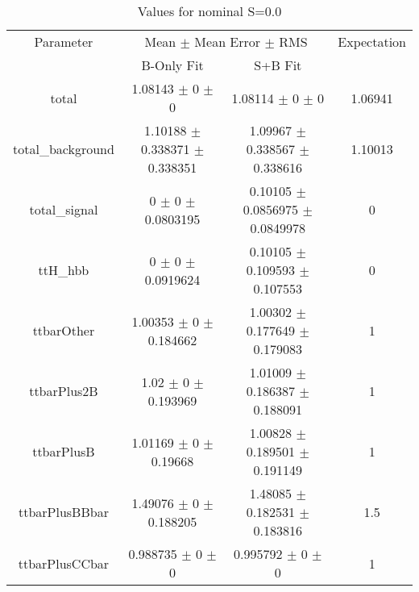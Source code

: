 \begin{table}
\centering
\caption{Values for nominal S=0.0}
\begin{tabular}{cccc}
\toprule
Parameter & \multicolumn{2}{c}{Mean $\pm$ Mean Error $\pm$ RMS} & Expectation\\
 & B-Only Fit & S+B Fit & \\
\midrule
total & \num{1.08143} $\pm$ \num{0} $\pm$ \num{0} & \num{1.08114} $\pm$ \num{0} $\pm$ \num{0} & \num{1.06941}\\
total\_background & \num{1.10188} $\pm$ \num{0.338371} $\pm$ \num{0.338351} & \num{1.09967} $\pm$ \num{0.338567} $\pm$ \num{0.338616} & \num{1.10013}\\
total\_signal & \num{0} $\pm$ \num{0} $\pm$ \num{0.0803195} & \num{0.10105} $\pm$ \num{0.0856975} $\pm$ \num{0.0849978} & \num{0}\\
ttH\_hbb & \num{0} $\pm$ \num{0} $\pm$ \num{0.0919624} & \num{0.10105} $\pm$ \num{0.109593} $\pm$ \num{0.107553} & \num{0}\\
ttbarOther & \num{1.00353} $\pm$ \num{0} $\pm$ \num{0.184662} & \num{1.00302} $\pm$ \num{0.177649} $\pm$ \num{0.179083} & \num{1}\\
ttbarPlus2B & \num{1.02} $\pm$ \num{0} $\pm$ \num{0.193969} & \num{1.01009} $\pm$ \num{0.186387} $\pm$ \num{0.188091} & \num{1}\\
ttbarPlusB & \num{1.01169} $\pm$ \num{0} $\pm$ \num{0.19668} & \num{1.00828} $\pm$ \num{0.189501} $\pm$ \num{0.191149} & \num{1}\\
ttbarPlusBBbar & \num{1.49076} $\pm$ \num{0} $\pm$ \num{0.188205} & \num{1.48085} $\pm$ \num{0.182531} $\pm$ \num{0.183816} & \num{1.5}\\
ttbarPlusCCbar & \num{0.988735} $\pm$ \num{0} $\pm$ \num{0} & \num{0.995792} $\pm$ \num{0} $\pm$ \num{0} & \num{1}\\
\bottomrule
\end{tabular}
\end{table}